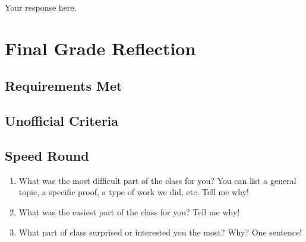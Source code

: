 \documentclass{scrbook}
\begin{document}
  Your response here.

  \chapter{Final Grade Reflection}

  

  \section{Requirements Met}



  \section{Unofficial Criteria}


  \section{Speed Round}
  \begin{enumerate}
  \item What was the most difficult part of the class for you?
    You can list a general topic, a specific proof, a type of work we
    did, etc. Tell me why! 
  \item What was the easiest part of the class for
    you? Tell me why! 
  \item What part of class surprised or interested you the
    most? Why? One sentence!
  \end{enumerate}
\end{document}
